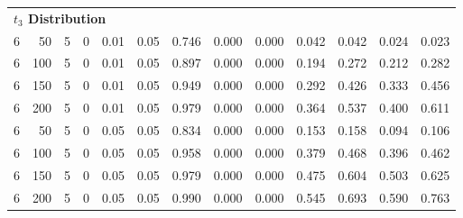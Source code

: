 \begin{table}
{{\begin{tabular}{rrrrrrlllllll}
\multicolumn{13}{l}{\textbf{$t_3$ Distribution}}\\
\hspace{1em}6 & 50 & 5 & 0 & 0.01 & 0.05 & 0.746 & 0.000 & 0.000 & 0.042 & 0.042 & 0.024 & 0.023\\
\hspace{1em}6 & 100 & 5 & 0 & 0.01 & 0.05 & 0.897 & 0.000 & 0.000 & 0.194 & 0.272 & 0.212 & 0.282\\
\hspace{1em}6 & 150 & 5 & 0 & 0.01 & 0.05 & 0.949 & 0.000 & 0.000 & 0.292 & 0.426 & 0.333 & 0.456\\
\hspace{1em}6 & 200 & 5 & 0 & 0.01 & 0.05 & 0.979 & 0.000 & 0.000 & 0.364 & 0.537 & 0.400 & 0.611\\
\hspace{1em}6 & 50 & 5 & 0 & 0.05 & 0.05 & 0.834 & 0.000 & 0.000 & 0.153 & 0.158 & 0.094 & 0.106\\
\hspace{1em}6 & 100 & 5 & 0 & 0.05 & 0.05 & 0.958 & 0.000 & 0.000 & 0.379 & 0.468 & 0.396 & 0.462\\
\hspace{1em}6 & 150 & 5 & 0 & 0.05 & 0.05 & 0.979 & 0.000 & 0.000 & 0.475 & 0.604 & 0.503 & 0.625\\
\hspace{1em}6 & 200 & 5 & 0 & 0.05 & 0.05 & 0.990 & 0.000 & 0.000 & 0.545 & 0.693 & 0.590 & 0.763\\
\bottomrule
\end{tabular}
}}
 \end{table}
